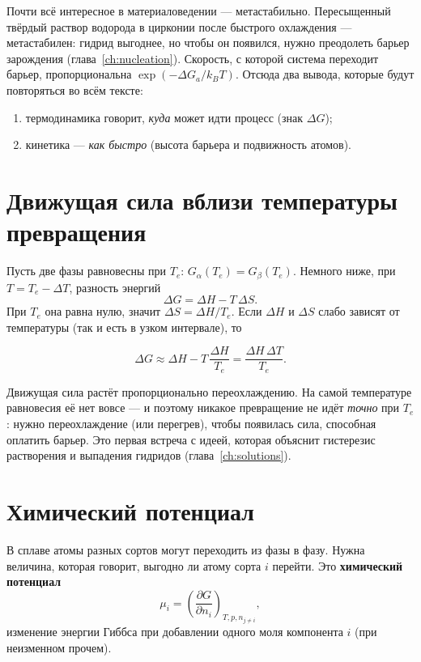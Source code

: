 
Почти всё интересное в материаловедении --- метастабильно. Пересыщенный твёрдый раствор водорода в цирконии
после быстрого охлаждения --- метастабилен: гидрид выгоднее, но чтобы он появился, нужно преодолеть барьер
зарождения (глава~\ref{ch:nucleation}). Скорость, с которой система переходит барьер, пропорциональна $\exp(-\Delta G_a/k_BT)$.
Отсюда два вывода, которые будут повторяться во всём тексте:
\begin{enumerate}
\item термодинамика говорит, \emph{куда} может идти процесс (знак $\Delta G$);
\item кинетика --- \emph{как быстро} (высота барьера и подвижность атомов).
\end{enumerate}

\section{Движущая сила вблизи температуры превращения}

Пусть две фазы равновесны при $T_e$: $G_\alpha(T_e) = G_\beta(T_e)$. Немного ниже, при $T = T_e - \Delta T$,
разность энергий
\[
\Delta G = \Delta H - T\,\Delta S .
\]
При $T_e$ она равна нулю, значит $\Delta S = \Delta H/T_e$. Если $\Delta H$ и $\Delta S$ слабо зависят от
температуры (так и есть в узком интервале), то
\begin{keyf}
\[
\Delta G \approx \Delta H - T\,\frac{\Delta H}{T_e} = \frac{\Delta H\,\Delta T}{T_e}.
\]
\end{keyf}
Движущая сила растёт пропорционально переохлаждению. На самой температуре равновесия её нет вовсе --- и поэтому
никакое превращение не идёт \emph{точно} при $T_e$: нужно переохлаждение (или перегрев), чтобы появилась сила,
способная оплатить барьер. Это первая встреча с идеей, которая объяснит гистерезис растворения и выпадения
гидридов (глава~\ref{ch:solutions}).

\section{Химический потенциал}

В сплаве атомы разных сортов могут переходить из фазы в фазу. Нужна величина, которая говорит, выгодно ли
атому сорта $i$ перейти. Это \textbf{химический потенциал}
\begin{equation}
\mu_i = \left(\frac{\partial G}{\partial n_i}\right)_{T,p,n_{j\ne i}},
\end{equation}
изменение энергии Гиббса при добавлении одного моля компонента $i$ (при неизменном прочем).

